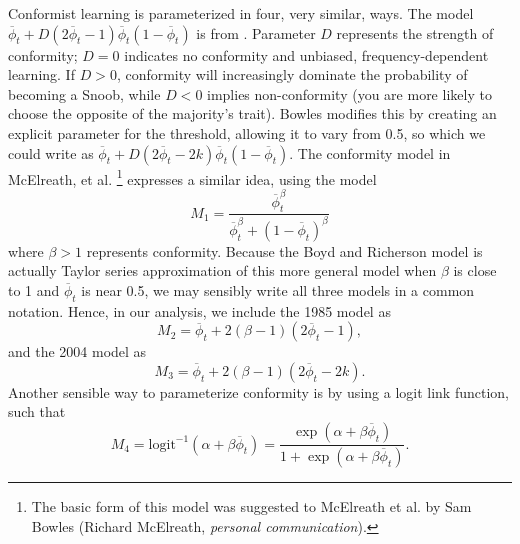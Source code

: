 Conformist learning is parameterized in four, very similar, ways.  The model $\overline{\phi}_t + D(2\overline{\phi}_t-1) \overline{\phi}_t (1-\overline{\phi}_t)$ is from \cite{boyd1985culture}.  Parameter $D$ represents the strength of conformity; $D=0$ indicates no conformity and unbiased, frequency-dependent learning.  If $D > 0$, conformity will increasingly dominate the probability of becoming a Snoob, while $D < 0$ implies non-conformity (you are more likely to choose the opposite of the majority's trait).  Bowles \cite{bowles2006microeconomics} modifies this by creating an explicit parameter for the threshold, allowing it to vary from 0.5, so which we could write as $\overline{\phi}_t + D(2\overline{\phi}_t-2k)\overline{\phi}_t(1-\overline{\phi}_t)$.  The conformity model in McElreath, et al. \citep{mcelreath2008beyond}\footnote{The basic form of this model was suggested to McElreath et al. by Sam Bowles (Richard McElreath, \textit{personal communication}).} expresses a similar idea, using the model
	\[ M_1 = \frac{\overline{\phi}_t^\beta}{\overline{\phi}_t^\beta + (1-\overline{\phi}_t)^\beta}
\]
where $\beta > 1$ represents conformity.  Because the Boyd and Richerson model is actually Taylor series approximation of this more general model when $\beta$ is close to 1 and $\overline{\phi}_t$ is near 0.5, we may sensibly write all three models in a common notation.  Hence, in our analysis, we include the 1985 model as
	\[ M_2 = \overline{\phi}_t + 2(\beta-1)(2\overline{\phi}_t-1),
\]
and the 2004 model as
	\[ M_3 = \overline{\phi}_t + 2(\beta-1)(2\overline{\phi}_t-2k).
\]
Another sensible way to parameterize conformity is by using a logit link function, such that
	\[ M_4 = \mathrm{logit}^{-1}(\alpha + \beta \overline{\phi}_t) = \frac{\exp(\alpha + \beta \overline{\phi}_t)}{1 + \exp(\alpha + \beta \overline{\phi}_t)}. \]

